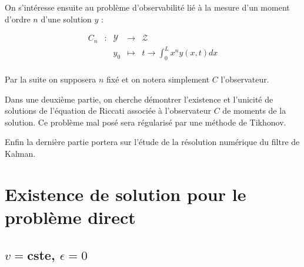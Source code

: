 \documentclass[a4paper]{article}
\begin{document}
\vspace{0.3cm}

On s'intéresse ensuite au problème d'observabilité lié à la mesure d'un moment d'ordre $n$ d'une solution $y$ :

 \begin{equation}
	\begin{array}{cc|ccc}
	C_n & : & \mathscr{Y} & \to & \mathscr{Z} \\
	 & & y_0 & \mapsto & t \to \int_0^L x^n y(x,t) dx\\
	\end{array}
\end{equation}

Par la suite on supposera $n$ fixé et on notera simplement $C$ l'observateur.

Dans une deuxième partie, on cherche démontrer l'existence et l'unicité de solutions
de l'équation de Riccati associée à l'observateur $C$ de moments de la solution.
Ce problème mal posé sera régularisé par une méthode de Tikhonov.

Enfin la dernière partie portera sur l'étude de la résolution numérique 
du filtre de Kalman.

\newpage
\section{Existence de solution pour le problème direct}




\subsection{$v=$cste, $\epsilon = 0$}
\end{document}

